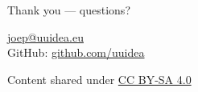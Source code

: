 \begin{frame}{Thank you — questions?}

\vspace{0.5cm}
\begin{center}
    {\large \href{mailto:joep@uuidea.eu}{joep@uuidea.eu}}\\[1em]
    {\large GitHub: \href{https://github.com/uuidea}{github.com/uuidea}}
\end{center}

\vspace{0.5cm}
\begin{center}
\small Content shared under \href{https://creativecommons.org/licenses/by-sa/4.0/}{CC BY-SA 4.0}
\end{center}

\end{frame}
